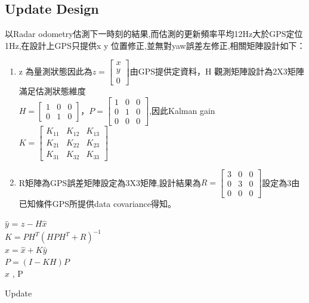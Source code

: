 \documentclass{article}
\begin{document}
\subsection{Update Design}
以Radar odometry估測下一時刻的結果,而估測的更新頻率平均12Hz大於GPS定位1Hz,在設計上GPS只提供x y 位置修正,並無對yaw誤差左修正,相關矩陣設計如下：
\begin{enumerate}
	\item z 為量測狀態因此為$z = \begin{bmatrix} x \\ y \\ 0 \end{bmatrix}$由GPS提供定資料，H 觀測矩陣設計為2X3矩陣滿足估測狀態維度\\$H=\begin{bmatrix} 1 & 0 & 0\\ 0 & 1 & 0\end{bmatrix}$，$P = \begin{bmatrix} 1 & 0 & 0\\ 0 & 1 & 0\\ 0 & 0 & 0 \end{bmatrix}$,因此Kalman gain $K = \begin{bmatrix}K_{11} & K_{12} & K_{13} \\ K_{21} & K_{22} & K_{23} \\ K_{31} & K_{32} & K_{33} \end{bmatrix}$
	\item R矩陣為GPS誤差矩陣設定為3X3矩陣,設計結果為$R = \begin{bmatrix} 3 & 0 & 0\\ 0 & 3 & 0\\ 0 & 0 & 0 \end{bmatrix}$設定為3由已知條件GPS所提供data covariance得知。
\end{enumerate}
\begin{algorithm}[H]
\DontPrintSemicolon 
{}
  $\hat{y}$ = $z - H\hat{x}$ \\
  $K=PH^T(HPH^T+R)^{-1}$ \\
  $\hat{x}=\hat{x}+K\hat{y}$ \\
  $P=(I-KH)P$ \\
  \Return $\hat{x}$ , P
  \caption{Update\cite{1}}
\end{algorithm}
\end{document}

